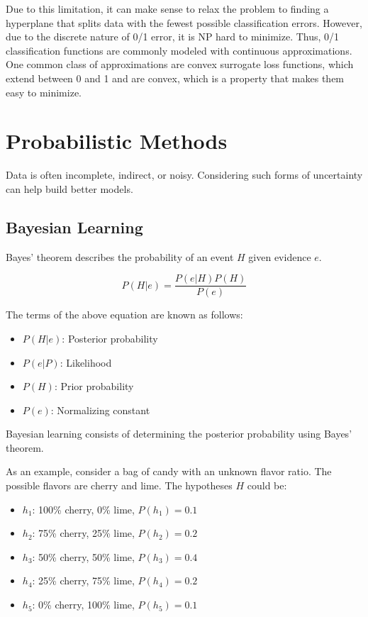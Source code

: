\documentclass[12pt,titlepage]{article}
\let\stdsection\section
\renewcommand\section{\clearpage\stdsection}
\begin{document}
      Due to this limitation, it can make sense to relax the problem to finding a hyperplane that splits data with the fewest possible classification errors. However, due to
      the discrete nature of 0/1 error, it is NP hard to minimize. Thus, 0/1 classification functions are commonly modeled with continuous approximations. One common class
      of approximations are convex surrogate loss functions, which extend between 0 and 1 and are convex, which is a property that makes them easy to minimize.

  \section{Probabilistic Methods}
    Data is often incomplete, indirect, or noisy. Considering such forms of uncertainty can help build better models.

    \subsection{Bayesian Learning}
      Bayes' theorem describes the probability of an event $H$ given evidence $e$.

      $$P(H|e) = \frac{P(e|H)P(H)}{P(e)}$$

      The terms of the above equation are known as follows:
      \begin{itemize}
        \item $P(H|e)$: Posterior probability
        \item $P(e|P)$: Likelihood
        \item $P(H)$: Prior probability
        \item $P(e)$: Normalizing constant
      \end{itemize}

      Bayesian learning consists of determining the posterior probability using Bayes' theorem.

      As an example, consider a bag of candy with an unknown flavor ratio. The possible flavors are cherry and lime. The hypotheses $H$ could be:
      \begin{itemize}
        \item $h_1$: 100\% cherry, 0\% lime, $P(h_1) = 0.1$
        \item $h_2$: 75\% cherry, 25\% lime, $P(h_2) = 0.2$
        \item $h_3$: 50\% cherry, 50\% lime, $P(h_3) = 0.4$
        \item $h_4$: 25\% cherry, 75\% lime, $P(h_4) = 0.2$
        \item $h_5$: 0\% cherry, 100\% lime, $P(h_5) = 0.1$
      \end{itemize}
\end{document}
